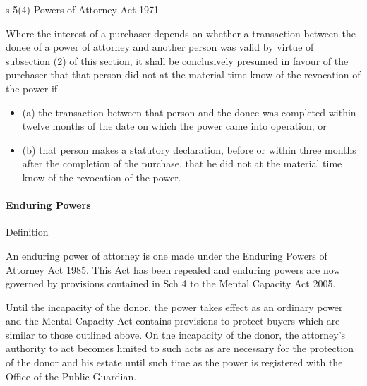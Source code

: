 \documentclass[
]{article}
\providecommand{\tightlist}{%
  \setlength{\itemsep}{0pt}\setlength{\parskip}{0pt}}
\newenvironment{env-b1feafbb-b990-4f84-956e-67a6473913ab}
{
    \savenotes\tcolorbox[blanker,breakable,left=5pt,borderline west={2pt}{-4pt}{green}]
}
{
    \endtcolorbox\spewnotes
}
\newenvironment{env-68b88379-d4cc-4b35-9b80-2115e064fa9f}
{
    \savenotes\tcolorbox[blanker,breakable,left=5pt,borderline west={2pt}{-4pt}{gold}]
}
{
    \endtcolorbox\spewnotes
}
\begin{document}
\begin{env-b1feafbb-b990-4f84-956e-67a6473913ab}

s 5(4) Powers of Attorney Act 1971

Where the interest of a purchaser depends on whether a transaction
between the donee of a power of attorney and another person was valid by
virtue of subsection (2) of this section, it shall be conclusively
presumed in favour of the purchaser that that person did not at the
material time know of the revocation of the power if---

\begin{itemize}
\tightlist
\item
  (a) the transaction between that person and the donee was completed
  within twelve months of the date on which the power came into
  operation; or
\item
  (b) that person makes a statutory declaration, before or within three
  months after the completion of the purchase, that he did not at the
  material time know of the revocation of the power.
\end{itemize}

\end{env-b1feafbb-b990-4f84-956e-67a6473913ab}

\hypertarget{enduring-powers}{%
\paragraph{Enduring Powers}\label{enduring-powers}}

\begin{env-68b88379-d4cc-4b35-9b80-2115e064fa9f}

Definition

An enduring power of attorney is one made under the Enduring Powers of
Attorney Act 1985. This Act has been repealed and enduring powers are
now governed by provisions contained in Sch 4 to the Mental Capacity Act
2005.

\end{env-68b88379-d4cc-4b35-9b80-2115e064fa9f}

Until the incapacity of the donor, the power takes effect as an ordinary
power and the Mental Capacity Act contains provisions to protect buyers
which are similar to those outlined above. On the incapacity of the
donor, the attorney's authority to act becomes limited to such acts as
are necessary for the protection of the donor and his estate until such
time as the power is registered with the Office of the Public Guardian.
\end{document}
